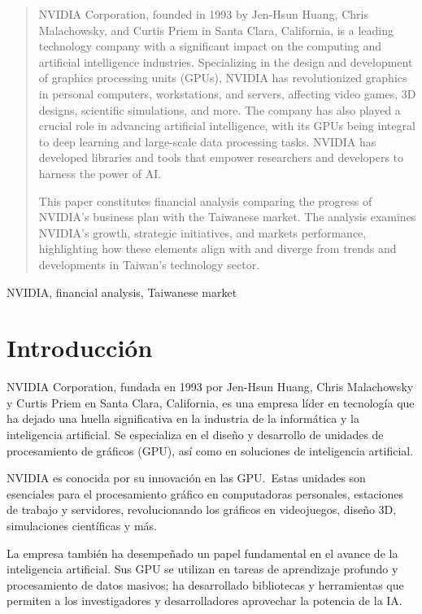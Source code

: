 \documentclass[conference]{IEEEtran}
\begin{document}
\begin{abstract}
	NVIDIA Corporation, founded in 1993 by Jen-Hsun Huang, Chris
	Malachowsky, and Curtis Priem in Santa Clara, California,
	is a leading technology company with a significant impact
	on the computing and artificial intelligence industries.
	Specializing in the design and development of graphics
	processing units (GPUs), NVIDIA has revolutionized graphics
	in personal computers, workstations, and servers, affecting
	video games, 3D designs, scientific simulations, and more. The
	company has also played a crucial role in advancing artificial
	intelligence, with its GPUs being integral to deep learning
	and large-scale data processing tasks. NVIDIA has developed
	libraries and tools that empower researchers and developers
	to harness the power of AI.\@{}

	This paper constitutes financial analysis comparing the
	progress of NVIDIA's business plan with the Taiwanese
	market. The analysis examines NVIDIA's growth, strategic
	initiatives, and markets performance, highlighting how
	these elements align with and diverge from trends and
	developments in Taiwan's technology sector.
\end{abstract}

\begin{IEEEkeywords}
	NVIDIA, financial analysis, Taiwanese market
\end{IEEEkeywords}

\nocite{Trazadores_cúbicos_2014}
\nocite{Chapra_Canale}

\section{Introducción}

NVIDIA Corporation, fundada en 1993 por Jen-Hsun Huang, Chris
Malachowsky y Curtis Priem en Santa Clara, California, es una
empresa líder en tecnología que ha dejado una huella
significativa en la industria de la informática y la
inteligencia artificial. Se especializa en el diseño y
desarrollo de unidades de procesamiento de gráficos (GPU),
así como en soluciones de inteligencia artificial.

NVIDIA es conocida por su innovación en las GPU.~Estas unidades
son esenciales para el procesamiento gráfico en computadoras
personales, estaciones de trabajo y servidores, revolucionando
los gráficos en videojuegos, diseño 3D, simulaciones científicas
y más.

La empresa también ha desempeñado un papel fundamental en
el avance de la inteligencia artificial. Sus GPU se utilizan
en tareas de aprendizaje profundo y procesamiento de datos
masivos; ha desarrollado bibliotecas y herramientas que
permiten a los investigadores y desarrolladores aprovechar
la potencia de la IA.\@{}
\end{document}
